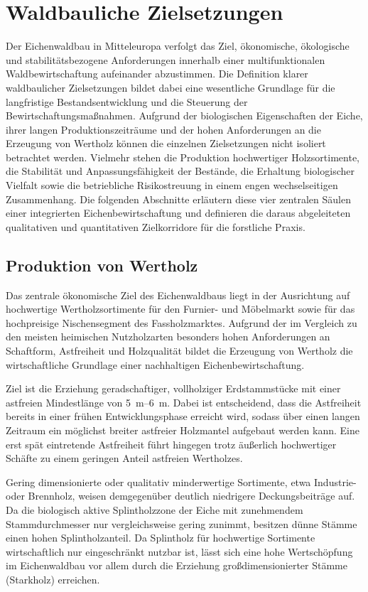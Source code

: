 \documentclass[twocolumn, bibliography=totoc, abstract=true]{scrartcl}
\begin{document}
\section{Waldbauliche Zielsetzungen}

Der Eichenwaldbau in Mitteleuropa verfolgt das Ziel, ökonomische, ökologische und stabilitätsbezogene Anforderungen innerhalb einer multifunktionalen Waldbewirtschaftung aufeinander abzustimmen. Die Definition klarer waldbaulicher Zielsetzungen bildet dabei eine wesentliche Grundlage für die langfristige Bestandsentwicklung und die Steuerung der Bewirtschaftungsmaßnahmen. Aufgrund der biologischen Eigenschaften der Eiche, ihrer langen Produktionszeiträume und der hohen Anforderungen an die Erzeugung von Wertholz können die einzelnen Zielsetzungen nicht isoliert betrachtet werden. Vielmehr stehen die Produktion hochwertiger Holzsortimente, die Stabilität und Anpassungsfähigkeit der Bestände, die Erhaltung biologischer Vielfalt sowie die betriebliche Risikostreuung in einem engen wechselseitigen Zusammenhang. Die folgenden Abschnitte erläutern diese vier zentralen Säulen einer integrierten Eichenbewirtschaftung und definieren die daraus abgeleiteten qualitativen und quantitativen Zielkorridore für die forstliche Praxis.

\subsection{Produktion von Wertholz}

Das zentrale ökonomische Ziel des Eichenwaldbaus liegt in der Ausrichtung auf hochwertige Wertholzsortimente für den Furnier- und Möbelmarkt sowie für das hochpreisige Nischensegment des Fassholzmarktes. Aufgrund der im Vergleich zu den meisten heimischen Nutzholzarten besonders hohen Anforderungen an Schaftform, Astfreiheit und Holzqualität bildet die Erzeugung von Wertholz die wirtschaftliche Grundlage einer nachhaltigen Eichenbewirtschaftung.

Ziel ist die Erziehung geradschaftiger, vollholziger Erdstammstücke mit einer astfreien Mindestlänge von \qtyrange{5}{6}{\m}. Dabei ist entscheidend, dass die Astfreiheit bereits in einer frühen Entwicklungsphase erreicht wird, sodass über einen langen Zeitraum ein möglichst breiter astfreier Holzmantel aufgebaut werden kann. Eine erst spät eintretende Astfreiheit führt hingegen trotz äußerlich hochwertiger Schäfte zu einem geringen Anteil astfreien Wertholzes.

Gering dimensionierte oder qualitativ minderwertige Sortimente, etwa Industrie- oder Brennholz, weisen demgegenüber deutlich niedrigere Deckungsbeiträge auf. Da die biologisch aktive Splintholzzone der Eiche mit zunehmendem Stammdurchmesser nur vergleichsweise gering zunimmt, besitzen dünne Stämme einen hohen Splintholzanteil. Da Splintholz für hochwertige Sortimente wirtschaftlich nur eingeschränkt nutzbar ist, lässt sich eine hohe Wertschöpfung im Eichenwaldbau vor allem durch die Erziehung großdimensionierter Stämme (Starkholz) erreichen.
\end{document}
